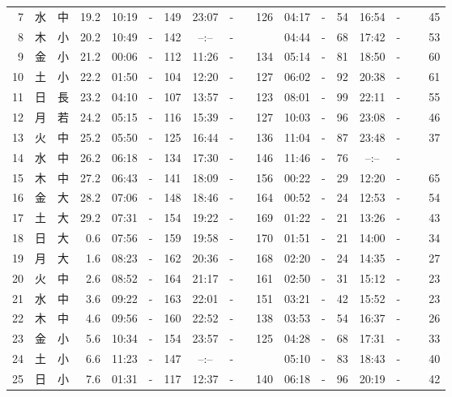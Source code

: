 \documentclass[12pt.a4j]{jsarticle}
\begin{document}
\begin{center}
\begin{table}[ht]
\begin{tabular}{|rc|cr|ccrccr|ccrccr|}
 7 & 水 & 中 & 19.2 &  10:19 &-& 149  &  23:07 &-& 126  &   04:17 &-&  54  &   16:54 &-&  45  \\
 8 & 木 & 小 & 20.2 &  10:49 &-& 142  &  --:-- &-&~~~~~ &   04:44 &-&  68  &   17:42 &-&  53  \\
 9 & 金 & 小 & 21.2 &  00:06 &-& 112  &  11:26 &-& 134  &   05:14 &-&  81  &   18:50 &-&  60  \\
10 & 土 & 小 & 22.2 &  01:50 &-& 104  &  12:20 &-& 127  &   06:02 &-&  92  &   20:38 &-&  61  \\
11 & 日 & 長 & 23.2 &  04:10 &-& 107  &  13:57 &-& 123  &   08:01 &-&  99  &   22:11 &-&  55  \\
12 & 月 & 若 & 24.2 &  05:15 &-& 116  &  15:39 &-& 127  &   10:03 &-&  96  &   23:08 &-&  46  \\
13 & 火 & 中 & 25.2 &  05:50 &-& 125  &  16:44 &-& 136  &   11:04 &-&  87  &   23:48 &-&  37  \\
14 & 水 & 中 & 26.2 &  06:18 &-& 134  &  17:30 &-& 146  &   11:46 &-&  76  &   --:-- &-&~~~~~ \\
15 & 木 & 中 & 27.2 &  06:43 &-& 141  &  18:09 &-& 156  &   00:22 &-&  29  &   12:20 &-&  65  \\
16 & 金 & 大 & 28.2 &  07:06 &-& 148  &  18:46 &-& 164  &   00:52 &-&  24  &   12:53 &-&  54  \\
17 & 土 & 大 & 29.2 &  07:31 &-& 154  &  19:22 &-& 169  &   01:22 &-&  21  &   13:26 &-&  43  \\
18 & 日 & 大 &  0.6 &  07:56 &-& 159  &  19:58 &-& 170  &   01:51 &-&  21  &   14:00 &-&  34  \\
19 & 月 & 大 &  1.6 &  08:23 &-& 162  &  20:36 &-& 168  &   02:20 &-&  24  &   14:35 &-&  27  \\
20 & 火 & 中 &  2.6 &  08:52 &-& 164  &  21:17 &-& 161  &   02:50 &-&  31  &   15:12 &-&  23  \\
21 & 水 & 中 &  3.6 &  09:22 &-& 163  &  22:01 &-& 151  &   03:21 &-&  42  &   15:52 &-&  23  \\
22 & 木 & 中 &  4.6 &  09:56 &-& 160  &  22:52 &-& 138  &   03:53 &-&  54  &   16:37 &-&  26  \\
23 & 金 & 小 &  5.6 &  10:34 &-& 154  &  23:57 &-& 125  &   04:28 &-&  68  &   17:31 &-&  33  \\
24 & 土 & 小 &  6.6 &  11:23 &-& 147  &  --:-- &-&~~~~~ &   05:10 &-&  83  &   18:43 &-&  40  \\
25 & 日 & 小 &  7.6 &  01:31 &-& 117  &  12:37 &-& 140  &   06:18 &-&  96  &   20:19 &-&  42  \\

\end{tabular}
\end{table}
\end{center}
\end{document}
